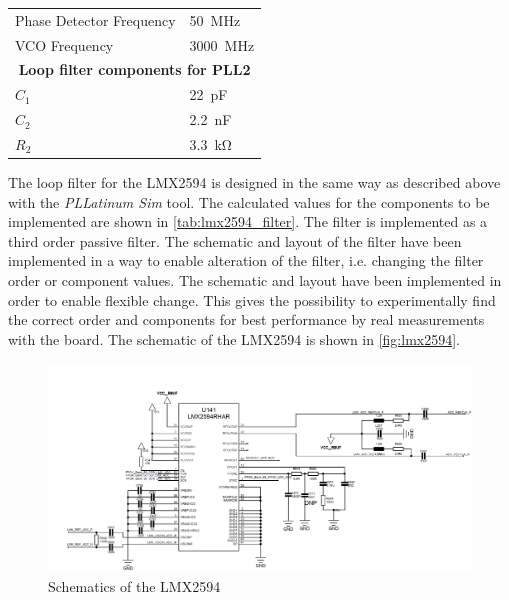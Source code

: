 \begin{table}[H]
\begin{tabularx}{\textwidth}{Xl}
		Phase Detector Frequency                                                  & \SI{50}{\MHz}            \\
		VCO Frequency                                                             & \SI{3000}{\MHz}          \\
		[0.3cm]
	    \multicolumn{2}{c}{\textbf{Loop filter components for PLL2}}   \\
		$C_{1}$                                                                   & \SI{22}{\pico\farad}     \\
		$C_{2}$                                                                   & \SI{2.2}{\nano\farad}    \\
		$R_{2}$                                                                   & \SI{3.3}{\kilo\ohm}      \\ \bottomrule
	\end{tabularx}
\end{table}

The loop filter for the LMX2594 is designed in the same way as described above with the \textit{PLLatinum Sim} tool. 
The calculated values for the components to be implemented are shown in \autoref{tab:lmx2594_filter}.
The filter is implemented as a third order passive filter.
The schematic and layout of the filter have been implemented in a way to enable alteration of the filter, i.e. changing the filter order or component values.
The schematic and layout have been implemented in order to enable flexible change.
This gives the possibility to experimentally find the correct order and components for best performance by real measurements with the board.
The schematic of the LMX2594 is shown in \autoref{fig:lmx2594}.

\begin{figure}[H]
	\centering
	\includegraphics[width = \textwidth]{chap/04-theresa/img/schematic/lmx2594}
	\caption{Schematics of the LMX2594}
	\label{fig:lmx2594}
\end{figure}

